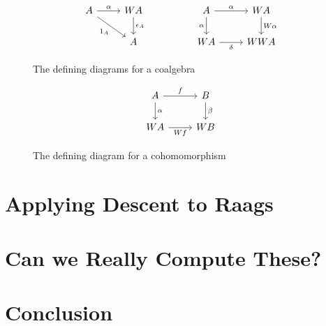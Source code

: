 \documentclass[12pt]{article}
\theoremstyle{definition}
\theoremstyle{theorem}
\begin{document}
\begin{figure}
    \caption{The defining diagrams for a coalgebra}
    \label{coalg}
    \[
        \begin{tikzcd}
        A & WA && A & WA \\
        & A && WA & WWA
        \arrow["\alpha", from=1-1, to=1-2]
        \arrow["{\epsilon_A}", from=1-2, to=2-2]
        \arrow["{1_A}"', from=1-1, to=2-2]
        \arrow["\alpha"', from=1-4, to=2-4]
        \arrow["\alpha", from=1-4, to=1-5]
        \arrow["\delta"', from=2-4, to=2-5]
        \arrow["W\alpha", from=1-5, to=2-5]
        \end{tikzcd}
    \]
\end{figure}

\begin{figure}
    \caption{The defining diagram for a cohomomorphism}
    \label{cohom}
    \[
        \begin{tikzcd}
        A & B \\
        WA & WB
        \arrow["\alpha", from=1-1, to=2-1]
        \arrow["\beta", from=1-2, to=2-2]
        \arrow["f", from=1-1, to=1-2]
        \arrow["Wf"', from=2-1, to=2-2]
        \end{tikzcd}
    \]    
\end{figure}



\section{Applying Descent to Raags}

\section{Can we Really Compute These?}

\section{Conclusion}


\newpage
\nocite{*}


\end{document}
